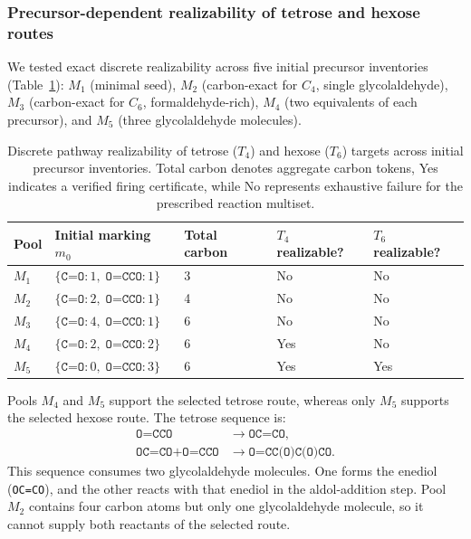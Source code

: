 \documentclass[pdflatex,referee]{../template/sn-jnl}
\theoremstyle{plain}%
\theoremstyle{definition}%
\theoremstyle{remark}%
\newcommand{\tabref}[1]{Table~\ref{#1}}
\begin{document}
\subsubsection{Precursor-dependent realizability of tetrose and hexose routes}

We tested exact discrete realizability across five initial precursor inventories (\tabref{tab:formose_exact_benchmark}): $M_1$ (minimal seed), $M_2$ (carbon-exact for $C_4$, single glycolaldehyde), $M_3$ (carbon-exact for $C_6$, formaldehyde-rich), $M_4$ (two equivalents of each precursor), and $M_5$ (three glycolaldehyde molecules).

\begin{table}[htbp]
\centering
\caption{Discrete pathway realizability of tetrose ($T_4$) and hexose ($T_6$) targets across initial precursor inventories. Total carbon denotes aggregate carbon tokens, Yes indicates a verified firing certificate, while No represents exhaustive failure for the prescribed reaction multiset.}
\label{tab:formose_exact_benchmark}
\begin{tabular}{lllll}
\toprule
\textbf{Pool} & \textbf{Initial marking} $m_0$ & \textbf{Total carbon} & $T_4$ \textbf{realizable?} & $T_6$ \textbf{realizable?} \\
\midrule
$M_1$ & $\{\texttt{C=O}:1,\;\texttt{O=CCO}:1\}$ & 3 & No & No \\
$M_2$ & $\{\texttt{C=O}:2,\;\texttt{O=CCO}:1\}$ & 4 & No & No \\
$M_3$ & $\{\texttt{C=O}:4,\;\texttt{O=CCO}:1\}$ & 6 & No & No \\
$M_4$ & $\{\texttt{C=O}:2,\;\texttt{O=CCO}:2\}$ & 6 & Yes & No \\
$M_5$ & $\{\texttt{C=O}:0,\;\texttt{O=CCO}:3\}$ & 6 & Yes & Yes \\
\bottomrule
\end{tabular}
\end{table}

Pools $M_4$ and $M_5$ support the selected tetrose route, whereas only $M_5$ supports the selected hexose route. The tetrose sequence is:
\begin{equation}
\begin{aligned}
\texttt{O=CCO} &\longrightarrow \texttt{OC=CO}, \\
\texttt{OC=CO} + \texttt{O=CCO} &\longrightarrow \texttt{O=CC(O)C(O)CO}.
\end{aligned}
\end{equation}
This sequence consumes two glycolaldehyde molecules. One forms the enediol (\texttt{OC=CO}), and the other reacts with that enediol in the aldol-addition step. Pool $M_2$ contains four carbon atoms but only one glycolaldehyde molecule, so it cannot supply both reactants of the selected route.
\end{document}
